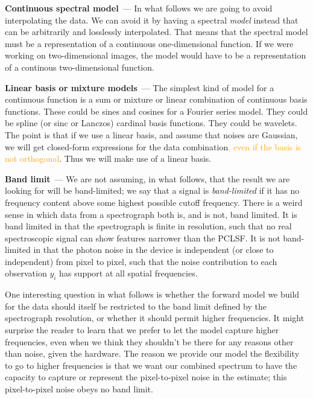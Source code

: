 \documentclass[modern, linenumbers]{aastex631}
\renewcommand{\paragraph}[1]{\medskip\par\noindent\textbf{#1}~---}
\newcommand{\modified}[1]{\textcolor{orange}{#1}}
\begin{document}
\paragraph{Continuous spectral model}
In what follows we are going to avoid interpolating the data.
We can avoid it by having a spectral \emph{model} instead that can be arbitrarily and losslessly interpolated.
That means that the spectral model must be a representation of a continuous one-dimensional function.
If we were working on two-dimensional images, the model would have to be a representation of a continous two-dimensional function.

\paragraph{Linear basis or mixture models}
The simplest kind of model for a continuous function is a sum or mixture or linear combination of continuous basis functions.
These could be sines and cosines for a Fourier series model.
They could be spline (or sinc or Lanczos) cardinal basis functions.
They could be wavelets.
The point is that if we use a linear basis, and assume that noises are Gaussian, we will get closed-form expressions for the data combination\modified{, even if the basis is not orthogonal}.
Thus we will make use of a linear basis.

\paragraph{Band limit}
We are not assuming, in what follows, that the result we are looking for will be band-limited;
we say that a signal is \emph{band-limited} if it has no frequency content above some highest possible cutoff frequency.
There is a weird sense in which data from a spectrograph both is, and is not, band limited.
It is band limited in that the spectrograph is finite in resolution, such that no real spectroscopic signal can show features narrower than the PCLSF.
It is not band-limited in that the photon noise in the device is independent (or close to independent) from pixel to pixel, such that the noise contribution to each observation $y_i$ has support at all spatial frequencies.

One interesting question in what follows is whether the forward model we build for the data should itself be restricted to the band limit defined by the spectrograph resolution, or whether it should permit higher frequencies.
It might surprise the reader to learn that we prefer to let the model capture higher frequencies, even when we think they shouldn't be there for any reasons other than noise, given the hardware.
The reason we provide our model the flexibility to go to higher frequencies is that we want our combined spectrum to have the capacity to capture or represent the pixel-to-pixel noise in the estimate; this pixel-to-pixel noise obeys no band limit.
\end{document}
